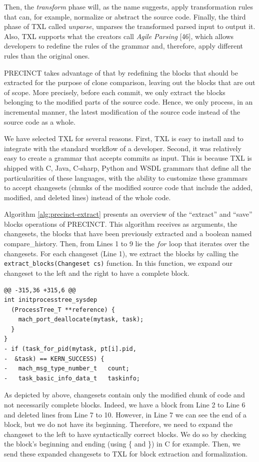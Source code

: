 \documentclass[12pt]{report}
\begin{document}
Then, the \emph{transform} phase will, as the name suggests, apply
transformation rules that can, for example, normalize or abstract the
source code. Finally, the third phase of TXL called \emph{unparse},
unparses the transformed parsed input to output it. Also, TXL supports
what the creators call \emph{Agile Parsing} {[}46{]}, which allows
developers to redefine the rules of the grammar and, therefore, apply
different rules than the original ones.

PRECINCT takes advantage of that by redefining the blocks that should be
extracted for the purpose of clone comparison, leaving out the blocks
that are out of scope. More precisely, before each commit, we only
extract the blocks belonging to the modified parts of the source code.
Hence, we only process, in an incremental manner, the latest
modification of the source code instead of the source code as a whole.

We have selected TXL for several reasons. First, TXL is easy to install
and to integrate with the standard workflow of a developer. Second, it
was relatively easy to create a grammar that accepts commits as input.
This is because TXL is shipped with C, Java, C-sharp, Python and WSDL
grammars that define all the particularities of these languages, with
the ability to customize these grammars to accept changesets (chunks of
the modified source code that include the added, modified, and deleted
lines) instead of the whole code.

Algorithm \ref{alg:precinct-extract} presents an overview of the
``extract'' and ``save'' blocks operations of PRECINCT. This algorithm
receives as arguments, the changesets, the blocks that have been
previously extracted and a boolean named compare\_history. Then, from
Lines 1 to 9 lie the \(for\) loop that iterates over the changesets. For
each changeset (Line 1), we extract the blocks by calling the
\lstinline!extract_blocks(Changeset cs)! function. In this function, we
expand our changeset to the left and the right to have a complete block.

\begin{lstlisting}
@@ -315,36 +315,6 @@
int initprocesstree_sysdep
  (ProcessTree_T **reference) {
    mach_port_deallocate(mytask, task);
  }
}
- if (task_for_pid(mytask, pt[i].pid,
-  &task) == KERN_SUCCESS) {
-   mach_msg_type_number_t   count;
-   task_basic_info_data_t   taskinfo;
\end{lstlisting}

As depicted by above, changesets contain only the modified chunk of code
and not necessarily complete blocks. Indeed, we have a block from Line 2
to Line 6 and deleted lines from Line 7 to 10. However, in Line 7 we can
see the end of a block, but we do not have its beginning. Therefore, we
need to expand the changeset to the left to have syntactically correct
blocks. We do so by checking the block's beginning and ending (using \{
and \}) in C for example. Then, we send these expanded changesets to TXL
for block extraction and formalization.
\end{document}
